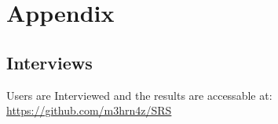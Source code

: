 \documentclass[a4paper,12pt]{report}
\begin{document}
%
%

\printbibliography[heading=subbibliography,title=References]

\printglossaries

\appendix
{}
\renewcommand{\thesection}{\Alph{section}}
\section{Appendix}
\subsection{Interviews}
Users are Interviewed and the results are accessable at: \href{https://github.com/m3hrn4z/SRS}{https://github.com/m3hrn4z/SRS}
\end{document}
